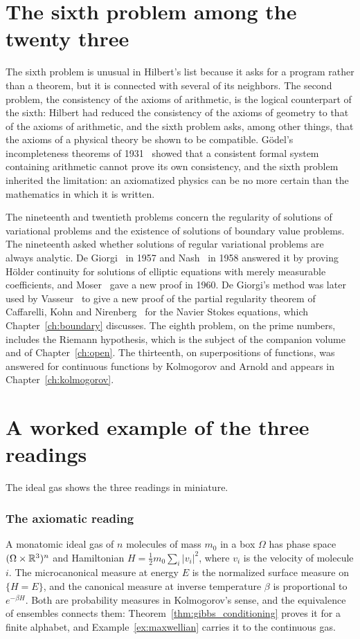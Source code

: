 \section{The sixth problem among the twenty three}

The sixth problem is unusual in Hilbert's list because it asks for a program rather than a theorem, but it is connected with several of its neighbors. The second problem, the consistency of the axioms of arithmetic, is the logical counterpart of the sixth: Hilbert had reduced the consistency of the axioms of geometry to that of the axioms of arithmetic, and the sixth problem asks, among other things, that the axioms of a physical theory be shown to be compatible. G\"odel's incompleteness theorems of 1931~\cite{goedel1931} showed that a consistent formal system containing arithmetic cannot prove its own consistency, and the sixth problem inherited the limitation: an axiomatized physics can be no more certain than the mathematics in which it is written.

The nineteenth and twentieth problems concern the regularity of solutions of variational problems and the existence of solutions of boundary value problems. The nineteenth asked whether solutions of regular variational problems are always analytic. De Giorgi~\cite{degiorgi1957} in 1957 and Nash~\cite{nash1958} in 1958 answered it by proving H\"older continuity for solutions of elliptic equations with merely measurable coefficients, and Moser~\cite{moser1960} gave a new proof in 1960. De Giorgi's method was later used by Vasseur~\cite{vasseur2007} to give a new proof of the partial regularity theorem of Caffarelli, Kohn and Nirenberg~\cite{ckn1982} for the Navier Stokes equations, which Chapter~\ref{ch:boundary} discusses. The eighth problem, on the prime numbers, includes the Riemann hypothesis, which is the subject of the companion volume~\cite{polsonh8} and of Chapter~\ref{ch:open}. The thirteenth, on superpositions of functions, was answered for continuous functions by Kolmogorov and Arnold and appears in Chapter~\ref{ch:kolmogorov}.

\section{A worked example of the three readings}

The ideal gas shows the three readings in miniature.

\subsubsection*{The axiomatic reading} A monatomic ideal gas of $n$ molecules of mass $m_0$ in a box $\Omega$ has phase space $(\Omega\times\mathbb{R}^3)^n$ and Hamiltonian $H = \frac12m_0\sum_i|v_i|^2$, where $v_i$ is the velocity of molecule $i$. The microcanonical measure at energy $E$ is the normalized surface measure on $\{H = E\}$, and the canonical measure at inverse temperature $\beta$ is proportional to $e^{-\beta H}$. Both are probability measures in Kolmogorov's sense, and the equivalence of ensembles connects them: Theorem~\ref{thm:gibbs_conditioning} proves it for a finite alphabet, and Example~\ref{ex:maxwellian} carries it to the continuous gas.

